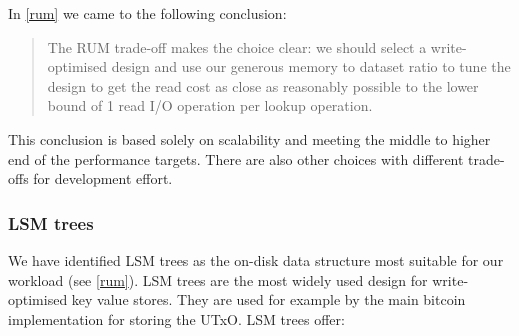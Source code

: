 \documentclass[11pt,a4paper]{article}
\begin{document}
In \cref{rum} we came to the following conclusion:
\begin{quote}
The RUM trade-off makes the choice clear: we should select a write-optimised
design and use our generous memory to dataset ratio to tune the design to get
the read cost as close as reasonably possible to the lower bound of 1 read I/O
operation per {\sc lookup} operation.
\end{quote}
This conclusion is based solely on scalability and meeting the middle to higher
end of the performance targets. There are also other choices with different
trade-offs for development effort.

\subsubsection{LSM trees}
We have identified LSM trees \citep{monkey} as the on-disk data structure most
suitable for our workload (see \cref{rum}). LSM trees are the most widely used
design for write-optimised key value stores. They are used for example by the
main bitcoin implementation for storing the UTxO. LSM trees offer:
\end{document}

